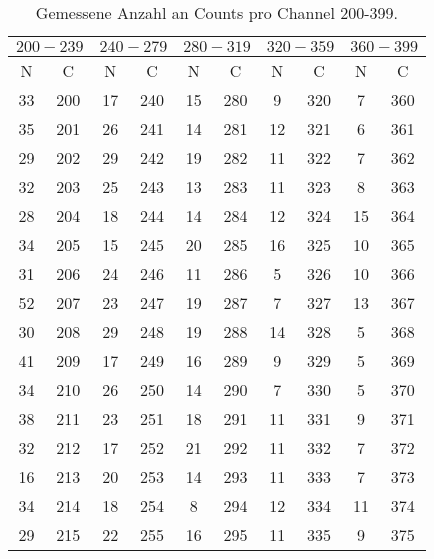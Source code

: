  \begin{table}
    \centering
    \caption{Gemessene Anzahl an Counts pro Channel 200-399.} 
    \label{}
    \label{2}
    \begin{tabular}{c c || c c || c c || c c || c c}
        \midrule
        \multicolumn{2}{c}{$200-239$} & \multicolumn{2}{c}{$240-279$} & \multicolumn{2}{c}{$280-319$} & \multicolumn{2}{c}{$320-359$} & \multicolumn{2}{c}{$360-399$} \\
        \midrule
        N & C & N & C & N & C & N & C & N & C \\
        \midrule
33      &200 & 17   &   240  & 15      &     280  &   9       &  320 & 7        & 360 \\   
35      &201 & 26   &   241  & 14      &     281  &   12      &  321 & 6        & 361 \\  
29      &202 & 29   &   242  & 19      &     282  &   11      &  322 & 7        & 362 \\  
32      &203 & 25   &   243  & 13      &     283  &   11      &  323 & 8        & 363 \\  
28      &204 & 18   &   244  & 14      &     284  &   12      &  324 & 15       & 364 \\  
34      &205 & 15   &   245  & 20      &     285  &   16      &  325 & 10       & 365 \\  
31      &206 & 24   &   246  & 11      &     286  &   5       &  326 & 10       & 366 \\  
52      &207 & 23   &   247  & 19      &     287  &   7       &  327 & 13       & 367 \\  
30      &208 & 29   &   248  & 19      &     288  &   14      &  328 & 5        & 368 \\  
41      &209 & 17   &   249  & 16      &     289  &   9       &  329 & 5        & 369 \\  
34      &210 & 26   &   250  & 14      &     290  &   7       &  330 & 5        & 370 \\  
38      &211 & 23   &   251  & 18      &     291  &   11      &  331 & 9        & 371 \\  
32      &212 & 17   &   252  & 21      &     292  &   11      &  332 & 7        & 372 \\  
16      &213 & 20   &   253  & 14      &     293  &   11      &  333 & 7        & 373 \\  
34      &214 & 18   &   254  & 8       &     294  &   12      &  334 & 11       & 374 \\  
29      &215 & 22   &   255  & 16      &     295  &   11      &  335 & 9        & 375 \\  

\end{tabular}
\end{table}
